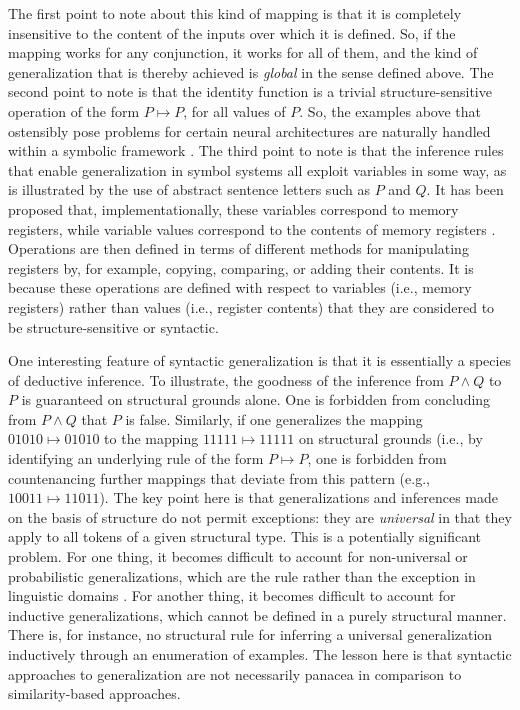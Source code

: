 The first point to note about this kind of mapping is that it is completely insensitive to the content of the inputs over which it is defined. So, if the mapping works for any conjunction, it works for all of them, and the kind of generalization that is thereby achieved is \textit{global} in the sense defined above. The second point to note is that the identity function is a trivial structure-sensitive operation of the form $P \mapsto P$, for all values of $P$. So, the examples above that ostensibly pose problems for certain neural architectures are naturally handled within a symbolic framework \citep{Hadley:2009,Marcus:1998}. The third point to note is that the inference rules that enable generalization in symbol systems all exploit variables in some way, as is illustrated by the use of abstract sentence letters such as $P$ and $Q$. It has been proposed that, implementationally, these variables correspond to memory registers, while variable values correspond to the contents of memory registers \citep{Marcus:1998}. Operations are then defined in terms of different methods for manipulating registers by, for example, copying, comparing, or adding their contents. It is because these operations are defined with respect to variables (i.e., memory registers) rather than values (i.e., register contents) that they are considered to be structure-sensitive or syntactic.

One interesting feature of syntactic generalization is that it is essentially a species of deductive inference. To illustrate, the goodness of the inference from $P \land Q$ to $P$ is guaranteed on structural grounds alone. One is forbidden from concluding from $P \land Q$ that $P$ is false. Similarly, if one generalizes the mapping $01010 \mapsto 01010$ to the mapping $11111 \mapsto 11111$ on structural grounds (i.e., by identifying an underlying rule of the form $P \mapsto P$, one is forbidden from countenancing further mappings that deviate from this pattern (e.g., $10011 \mapsto 11011$). The key point here is that generalizations and inferences made on the basis of structure do not permit exceptions: they are \textit{universal} in that they apply to all tokens of a given structural type. This is a potentially significant problem. For one thing, it becomes difficult to account for non-universal or probabilistic generalizations, which are the rule rather than the exception in linguistic domains \citep{SmolenskyLegendre:2006,ChaterManning:2006,Manning:2015,Seidenberg:1997}. For another thing, it becomes difficult to account for inductive generalizations, which cannot be defined in a purely structural manner. There is, for instance, no structural rule for inferring a universal generalization inductively through an enumeration of examples. The lesson here is that syntactic approaches to generalization are not necessarily panacea in comparison to similarity-based approaches. 

